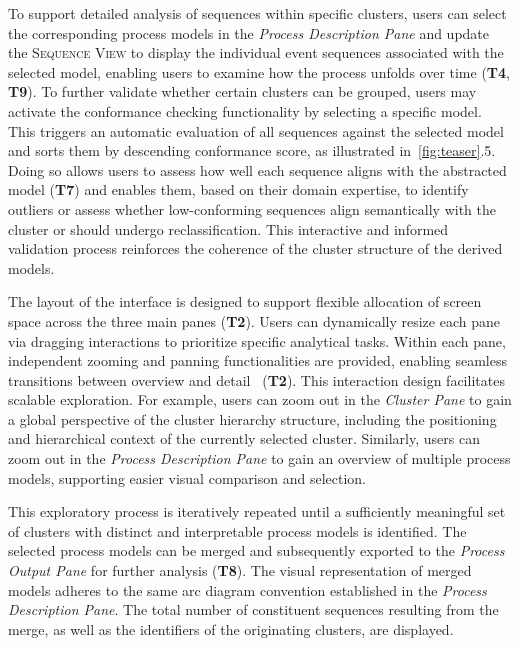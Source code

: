\documentclass[preprint,journal]{vgtc}            %
\begin{document}
To support detailed analysis of sequences within specific clusters, users can select the corresponding process models in the \textit{Process Description Pane} and update the \textsc{Sequence View} to display the individual event sequences associated with the selected model, enabling users to examine how the process unfolds over time (\textbf{T4}, \textbf{T9}).
To further validate whether certain clusters can be grouped, users may activate the conformance checking functionality by selecting a specific model.
This triggers an automatic evaluation of all sequences against the selected model and sorts them by descending conformance score, as illustrated in~\cref{fig:teaser}.5.
Doing so allows users to assess how well each sequence aligns with the abstracted model (\textbf{T7}) and enables them, based on their domain expertise, to identify outliers or assess whether low-conforming sequences align semantically with the cluster or should undergo reclassification.
This interactive and informed validation process reinforces the coherence of the cluster structure of the derived models.

The layout of the interface is designed to support flexible allocation of screen space across the three main panes (\textbf{T2}).
Users can dynamically resize each pane via dragging interactions to prioritize specific analytical tasks.
Within each pane, independent zooming and panning functionalities are provided, enabling seamless transitions between overview and detail~\cite{Shneiderman1996The} (\textbf{T2}).
This interaction design facilitates scalable exploration.
For example, users can zoom out in the \textit{Cluster Pane} to gain a global perspective of the cluster hierarchy structure, including the positioning and hierarchical context of the currently selected cluster.
Similarly, users can zoom out in the \textit{Process Description Pane} to gain an overview of multiple process models, supporting easier visual comparison and selection.

This exploratory process is iteratively repeated until a sufficiently meaningful set of clusters with distinct and interpretable process models is identified.
The selected process models can be merged and subsequently exported to the \textit{Process Output Pane} for further analysis (\textbf{T8}).
The visual representation of merged models adheres to the same arc diagram convention established in the \textit{Process Description Pane}.
The total number of constituent sequences resulting from the merge, as well as the identifiers of the originating clusters, are displayed.
\end{document}
